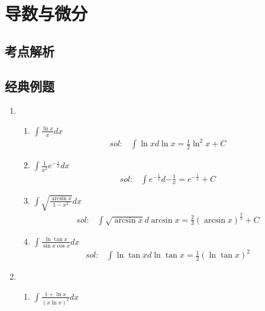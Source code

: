\chapter{导数与微分}
\section{考点解析} %
\label{sec:考点解析}


\section{经典例题} %
\label{sec:经典例题}

\begin{enumerate}[{例}1.]
    \item   \begin{enumerate}[(1)]
                \item $\int \frac{\ln x}{x}dx$
                    \begin{align*}
                        sol:&\int\ln xd\ln x=\frac{1}{2}\ln^2 x+C
                    \end{align*}
                \item $\int \frac{1}{x^2}e^{-\frac{1}{x}}dx$
                    \begin{align*}
                        sol:&\int e^{-\frac{1}{x}}d{-\frac{1}{x}}=e^{-\frac{1}{x}}+C
                    \end{align*}
                \item $\int \sqrt{\frac{\arcsin x}{1-x^2}}dx$
                    \begin{align*}
                        sol:&\int \sqrt{\arcsin x}d\arcsin x=\frac{2}{3}(\arcsin x)^{\frac{3}{2}}+C
                    \end{align*}
                \item $\int \frac{\ln \tan x}{\sin x \cos x}dx$
                    \begin{align*}
                        sol:&\int \ln\tan xd\ln\tan x=\frac{1}{2}(\ln\tan x)^2
                    \end{align*}
            \end{enumerate}
    \item   \begin{enumerate}[(1)]
                \item $\int \frac{1+\ln x}{(x\ln x)^2}dx$
                    \begin{align*}

\end{align*}
\end{enumerate}
\end{enumerate}
